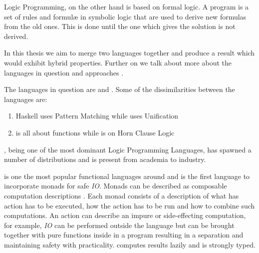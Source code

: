 \documentclass[thesis-solanki.tex]{subfiles}
\begin{document}
Logic Programming, \cite{spivey1995introduction} on the other hand is based on formal logic.
A program is a set of rules and formul\ae{} in symbolic logic that are used to derive new formulas from the old
ones.
This is done until the one which gives the solution is not derived.


In this thesis we aim to merge two languages
together and produce a result which would exhibit hybrid
properties.
Further on we talk about more about the languages in question and approaches .

The languages in question are  and . Some of the dissimilarities between the languages are:
\begin{enumerate}
\item { Haskell} uses Pattern Matching while  uses Unification

\item {} is all about functions while  is on Horn Clause Logic
\end{enumerate} 

 \cite{wikiprolog}, being one of the most dominant Logic Programming
Languages, has  
spawned a number of distributions and is present from academia to industry.  

 is one the most popular \cite{website:langpop} functional languages around and is the 
first language to incorporate monads \cite{wadler1992comprehending} for safe \textit{IO}. Monads can be 
described as composable computation descriptions \cite{website:monadshaskellorg} . Each monad consists of a 
description of what has action has to be executed, how the action has to be run and how to combine such 
computations. An action can describe an impure or side-effecting computation, for example, \textit{IO} can be 
performed outside the language but can be brought together with pure functions inside in a program resulting in a 
separation and maintaining safety with practicality.  computes results lazily and is strongly 
typed. 
\end{document}
